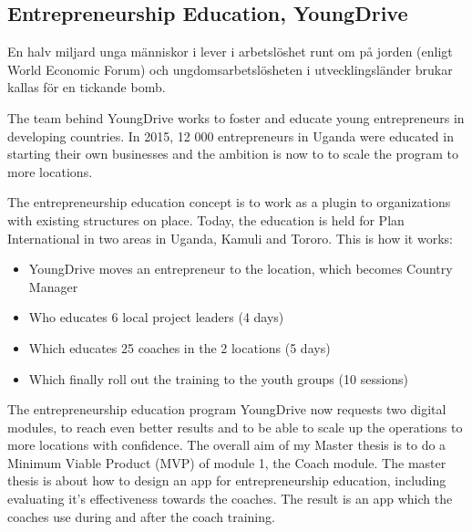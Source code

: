 \subsection{Entrepreneurship Education, YoungDrive}


En halv miljard unga människor i lever i arbetslöshet runt om på jorden (enligt World Economic Forum) och ungdomsarbetslösheten i utvecklingsländer brukar kallas för en tickande bomb.

The team behind YoungDrive works to foster and educate young entrepreneurs in developing countries. In 2015, 12 000 entrepreneurs in Uganda were educated in starting their own businesses and the ambition is now to to scale the program to more locations.

The entrepreneurship education concept is to work as a plugin to organizations with existing structures on place. Today, the education is held for Plan International in two areas in Uganda, Kamuli and Tororo. This is how it works:


\begin{itemize}
    \item YoungDrive moves an entrepreneur to the location, which becomes Country Manager %
    \item Who educates 6 local project leaders (4 days) %
    \item Which educates 25 coaches in the 2 locations (5 days) %
    \item Which finally roll out the training to the youth groups (10 sessions) %
\end{itemize}

The entrepreneurship education program YoungDrive now requests two digital modules, to reach even better results and to be able to scale up the operations to more locations with confidence. The overall aim of my Master thesis is to do a Minimum Viable Product (MVP) of module 1, the Coach module. The master thesis is about how to design an app for entrepreneurship education, including evaluating it's effectiveness towards the coaches. The result is an app which the coaches use during and after the coach training.